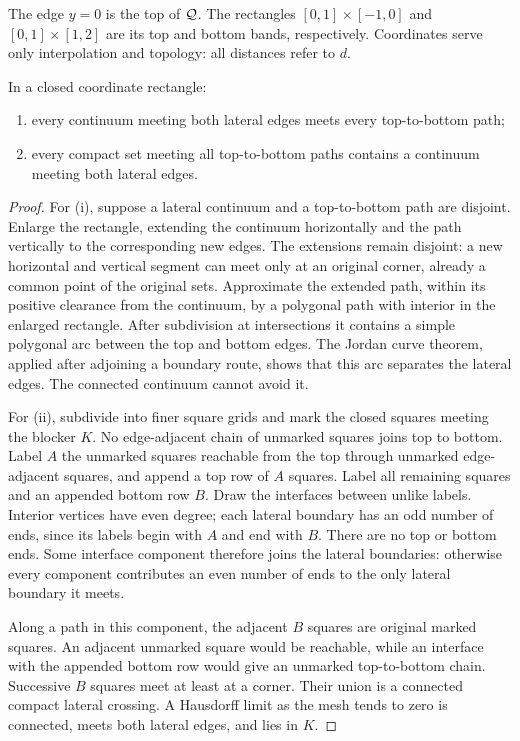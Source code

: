 The edge $y=0$ is the top of $\mathcal Q$. The rectangles
$[0,1]\times[-1,0]$ and $[0,1]\times[1,2]$ are its top and bottom
bands, respectively. Coordinates serve only interpolation and topology:
all distances refer to $d$.

\begin{lemma}
\label{lem:planar-blocker}
In a closed coordinate rectangle:
\begin{enumerate}[label=\textup{(\roman*)}]
\item every continuum meeting both lateral edges meets every
top-to-bottom path;
\item every compact set meeting all top-to-bottom paths contains
a continuum meeting both lateral edges.
\end{enumerate}
\end{lemma}
\begin{proof}
For (i), suppose a lateral continuum and a top-to-bottom path are
disjoint. Enlarge the rectangle, extending the continuum horizontally
and the path vertically to the corresponding new edges. The extensions
remain disjoint: a new horizontal and vertical segment can meet only at
an original corner, already a common point of the original sets.
Approximate the extended path, within its positive clearance from the
continuum, by a polygonal path with interior in the enlarged rectangle.
After subdivision at intersections it contains a simple polygonal arc
between the top and bottom edges. The Jordan curve theorem, applied
after adjoining a boundary route, shows that this arc separates the
lateral edges. The connected continuum cannot avoid it.

For (ii), subdivide into finer square grids and mark the closed squares
meeting the blocker $K$. No edge-adjacent chain of unmarked squares
joins top to bottom. Label $A$ the unmarked squares reachable from the
top through unmarked edge-adjacent squares, and append a top row of
$A$ squares. Label all remaining squares and an appended bottom row $B$.
Draw the interfaces between unlike labels. Interior vertices have even
degree; each lateral boundary has an odd number of ends, since its
labels begin with $A$ and end with $B$. There are no top or bottom ends.
Some interface component therefore joins the lateral boundaries:
otherwise every component contributes an even number of ends to the
only lateral boundary it meets.

Along a path in this component, the adjacent $B$ squares are original
marked squares. An adjacent unmarked square would be reachable, while
an interface with the appended bottom row would give an unmarked
top-to-bottom chain. Successive $B$ squares meet at least at a corner.
Their union is a connected compact lateral crossing. A Hausdorff limit
as the mesh tends to zero is connected, meets both lateral edges, and
lies in $K$.
\end{proof}

